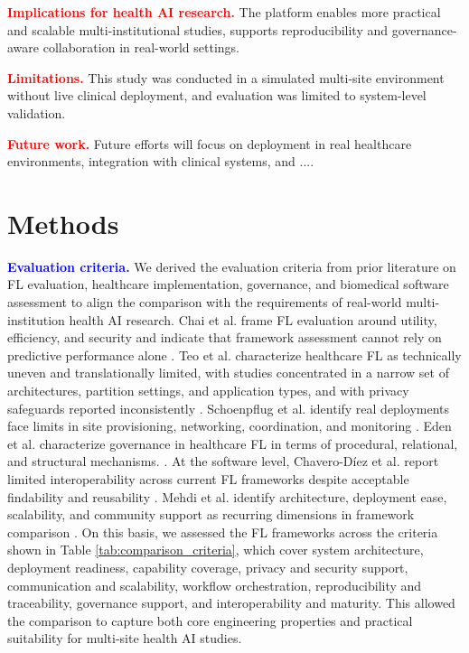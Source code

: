 \documentclass[preprint,5p, 10pt, times]{elsarticle}
\begin{document}
\textcolor{red}{\textbf{Implications for health AI research.}} The platform enables more practical and scalable multi-institutional studies, supports reproducibility and governance-aware collaboration in real-world settings.

\textcolor{red}{\textbf{Limitations.}} This study was conducted in a simulated multi-site environment without live clinical deployment, and evaluation was limited to system-level validation.

\textcolor{red}{\textbf{Future work.}} Future efforts will focus on deployment in real healthcare environments, integration with clinical systems, and ....



\section*{Methods}
\textcolor{blue}{\textbf{Evaluation criteria.}}
We derived the evaluation criteria from prior literature on FL evaluation, healthcare implementation, governance, and biomedical software assessment to align the comparison with the requirements of real-world multi-institution health AI research. 
Chai et al. frame FL evaluation around utility, efficiency, and security and indicate that framework assessment cannot rely on predictive performance alone \cite{chai2024survey}.
Teo et al. characterize healthcare FL as technically uneven and translationally limited, with studies concentrated in a narrow set of architectures, partition settings, and application types, and with privacy safeguards reported inconsistently \cite{teo2024federated}.
Schoenpflug et al. identify real deployments face limits in site provisioning, networking, coordination, and monitoring \cite{schoenpflug2025navigating}. 
Eden et al. characterize governance in healthcare FL in terms of procedural, relational, and structural mechanisms. \cite{eden2025scoping}.
At the software level, Chavero-Díez et al. report limited interoperability across current FL frameworks despite acceptable findability and reusability \cite{chavero2026federated}. 
Mehdi et al. identify architecture, deployment ease, scalability, and community support as recurring dimensions in framework comparison \cite{mehdi2025comprehensive}.
On this basis, we assessed the FL frameworks across the criteria shown in Table \ref{tab:comparison_criteria}, which cover system architecture, deployment readiness, capability coverage, privacy and security support, communication and scalability, workflow orchestration, reproducibility and traceability, governance support, and interoperability and maturity. This allowed the comparison to capture both core engineering properties and practical suitability for multi-site health AI studies.
\end{document}
